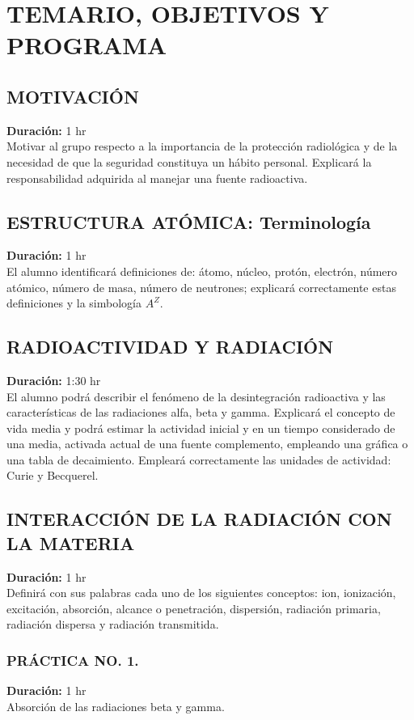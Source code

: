\section{TEMARIO, OBJETIVOS Y PROGRAMA}

\subsection{MOTIVACIÓN}
\textbf{Duración:} 1 hr\\
Motivar al grupo respecto a la importancia de la protección radiológica y de la necesidad de que la seguridad constituya un hábito personal. Explicará la responsabilidad adquirida al manejar una fuente radioactiva.

\subsection{ESTRUCTURA ATÓMICA: Terminología}
\textbf{Duración:} 1 hr\\
El alumno identificará definiciones de: átomo, núcleo, protón, electrón, número atómico, número de masa, número de neutrones; explicará correctamente estas definiciones y la simbología $A^Z$.

\subsection{RADIOACTIVIDAD Y RADIACIÓN}
\textbf{Duración:} 1:30 hr\\
El alumno podrá describir el fenómeno de la desintegración radioactiva y las características de las radiaciones alfa, beta y gamma. Explicará el concepto de vida media y podrá estimar la actividad inicial y en un tiempo considerado de una media, activada actual de una fuente complemento, empleando una gráfica o una tabla de decaimiento. Empleará correctamente las unidades de actividad: Curie y Becquerel.

\subsection{INTERACCIÓN DE LA RADIACIÓN CON LA MATERIA}
\textbf{Duración:} 1 hr\\
Definirá con sus palabras cada uno de los siguientes conceptos: ion, ionización, excitación, absorción, alcance o penetración, dispersión, radiación primaria, radiación dispersa y radiación transmitida.

\subsubsection{PRÁCTICA NO. 1.}
\textbf{Duración:} 1 hr\\
Absorción de las radiaciones beta y gamma.

